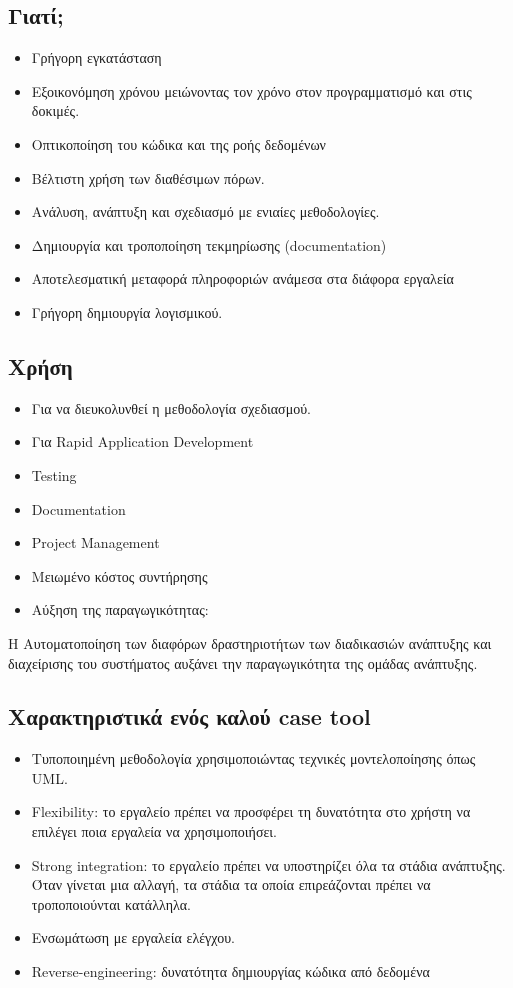 \subsection{Γιατί;}
\begin{itemize}
	\item Γρήγορη εγκατάσταση
	\item Εξοικονόμηση χρόνου μειώνοντας τον χρόνο στον προγραμματισμό και στις δοκιμές.
	\item Οπτικοποίηση του κώδικα και της ροής δεδομένων
	\item Βέλτιστη χρήση των διαθέσιμων πόρων.
	\item Ανάλυση, ανάπτυξη και σχεδιασμό με ενιαίες μεθοδολογίες.
	\item Δημιουργία και τροποποίηση τεκμηρίωσης (documentation)
	\item Αποτελεσματική μεταφορά πληροφοριών ανάμεσα στα διάφορα εργαλεία
	\item Γρήγορη δημιουργία λογισμικού.
\end{itemize}

\subsection{Χρήση}
\begin{itemize}
	\item Για να διευκολυνθεί η μεθοδολογία σχεδιασμού. 
	\item Για Rapid Application Development
	\item Testing
	\item Documentation
	\item Project Management
	\item Μειωμένο κόστος συντήρησης
	\item Αύξηση της παραγωγικότητας:
\end{itemize}
H Αυτοματοποίηση των διαφόρων δραστηριοτήτων των διαδικασιών ανάπτυξης και διαχείρισης του συστήματος αυξάνει την παραγωγικότητα της ομάδας ανάπτυξης.

\subsection{Χαρακτηριστικά ενός καλού case tool}
\begin{itemize}
	\item Τυποποιημένη μεθοδολογία χρησιμοποιώντας τεχνικές μοντελοποίησης όπως UML.
	\item Flexibility: το εργαλείο πρέπει να προσφέρει τη δυνατότητα στο χρήστη να επιλέγει ποια εργαλεία να χρησιμοποιήσει.
	\item Strong integration: το εργαλείο πρέπει να υποστηρίζει όλα τα στάδια ανάπτυξης. Όταν γίνεται μια αλλαγή, τα στάδια τα οποία επιρεάζονται πρέπει να τροποποιούνται κατάλληλα.
	\item Ενσωμάτωση με εργαλεία ελέγχου.
	\item Reverse-engineering: δυνατότητα δημιουργίας κώδικα από δεδομένα
\end{itemize}

	
